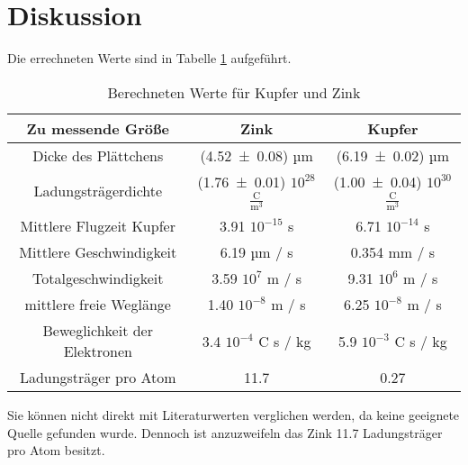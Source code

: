 \section{Diskussion}
\label{sec:Diskussion}
Die errechneten Werte sind in Tabelle \ref{tab:Erg} aufgeführt.

\begin{table}
  \centering
  \begin{tabular}{c|c c}
    \toprule
	Zu messende Größe & Zink & Kupfer \\
    \midrule
	Dicke des Plättchens & (\num{4.52 +- 0.08}) µm & (\num{6.19 +- 0.02}) µm \\
	Ladungsträgerdichte & (\num{1.76 +- 0.01}) $10^{28}$ $\frac{\text{C}}{\text{m}^3}$ & (\num{1.00 +- 0.04}) $10^{30}$ $\frac{\text{C}}{\text{m}^3}$\\
	Mittlere Flugzeit Kupfer & 3.91 \cdot $10^{-15}$ s & 6.71 \cdot $10^{-14}$ s \\
	Mittlere Geschwindigkeit & 6.19 µm / s & 0.354 mm / s \\
	Totalgeschwindigkeit & 3.59 \cdot $10^7$ m / s & 9.31 \cdot $10^6$ m / s\\
	mittlere freie Weglänge & 1.40 \cdot $10^{-8}$ m / s& 6.25 \cdot $10^{-8}$ m / s \\
	Beweglichkeit der Elektronen & 3.4 \cdot $10^{-4}$ C \cdot s / kg & 5.9 \cdot $10^{-3}$ C \cdot s / kg \\
	Ladungsträger pro Atom & 11.7 & 0.27 \\

    \bottomrule
  \end{tabular}
  \caption{Berechneten Werte für Kupfer und Zink}
  \label{tab:Erg}
\end{table}

Sie können nicht direkt mit Literaturwerten verglichen werden, da keine geeignete Quelle gefunden wurde. Dennoch ist anzuzweifeln das Zink 11.7 Ladungsträger pro Atom besitzt.
